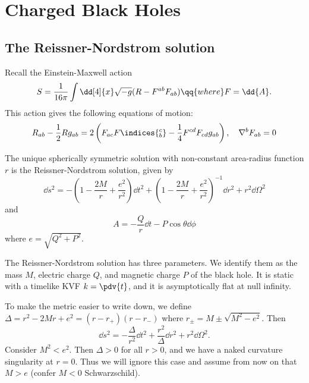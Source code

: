 \documentclass{jknotes}
\begin{document}
\section{Charged Black Holes}
\subsection{The Reissner-Nordstrom solution}
Recall the Einstein-Maxwell action
\begin{equation}
    S = \frac{1}{16\pi}\int\dd[4]{x}\sqrt{-g}(R-F^{ab}F_{ab}) \qq{where} F=\dd{A}.
\end{equation}
This action gives the following equations of motion:
\begin{equation}
    R_{ab}-\frac{1}{2}Rg_{ab} = 2\left(F_{ac}F\indices{_b^c} - \frac{1}{4}F^{cd}F_{cd}g_{ab}\right), \quad \nabla^b F_{ab} = 0
\end{equation}

\begin{theorem}
    The unique spherically symmetric solution with non-constant area-radius function \(r\) is the Reissner-Nordstrom solution, given by
    \begin{equation}
        \dd{s}^2 = -\left(1-\frac{2M}{r} + \frac{e^2}{r^2}\right)\dd{t}^2 + \left(1-\frac{2M}{r}+\frac{e^2}{r^2}\right)^{-1}\dd{r}^2 + r^2\dd{\Omega}^2
    \end{equation}
    and
    \begin{equation}
        A = -\frac{Q}{r}\dd{t}-P\cos\theta\dd{\phi}
    \end{equation}
    where \(e=\sqrt{Q^2+P^2}\).
\end{theorem}
The Reissner-Nordstrom solution has three parameters. We identify them as the mass \(M\), electric charge \(Q\), and magnetic charge \(P\) of the black hole. It is static with a timelike KVF \(k=\pdv{t}\), and it is asymptotically flat at null infinity.

To make the metric easier to write down, we define \(\Delta = r^2-2Mr + e^2 = (r-r_+)(r-r_-)\) where \(r_\pm=M\pm\sqrt{M^2-e^2}\). Then
\begin{equation}
    \dd{s}^2 = - \frac{\Delta}{r^2}\dd{t}^2 + \frac{r^2}{\Delta}\dd{r}^2 + r^2\dd{\Omega}^2.
\end{equation}
Consider \(M^2<e^2\). Then \(\Delta > 0\) for all \(r>0\), and we have a naked curvature singularity at \(r=0\). Thus we will ignore this case and assume from now on that \(M>e\) (confer \(M<0\) Schwarzschild).
\end{document}
